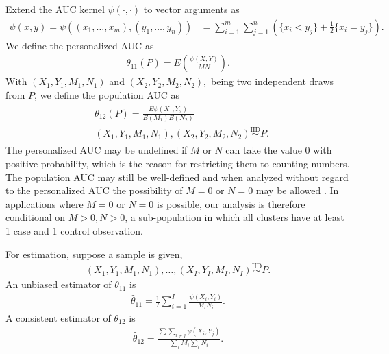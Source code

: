 \documentclass[12pt]{article}
\DeclareMathOperator{\AUC}{AUC}
\newcommand{\I}{I}
\newcommand{\E}{E}
\renewcommand{\P}{P}
\newcommand{\cind}{\perp \!\!\! \perp}
\newcommand{\aucindiv}{\theta_{11}}%
\newcommand{\aucpop}{\theta_{12}}%
\newcommand{\aucindivhat}{\hat{\theta}_{11}}%
\newcommand{\aucpophat}{\hat{\theta}_{12}}%
\newcommand{\kernel}{\psi}
\begin{document}
Extend the AUC kernel $\kernel(\cdot, \cdot)$ to vector arguments as
\begin{align}
  \kernel(x,y)=\kernel((x_1,\ldots,x_m),(y_1,\ldots,y_n))&=\sum_{i=1}^m\sum_{j=1}^n\left(\{x_i<y_j\}+\frac{1}{2}\{x_i=y_j\}\right).\label{defn:auc kernel}
\end{align}
We define the personalized AUC as
\begin{align}
  \aucindiv(\P)=\E\left(\frac{\psi(X,Y)}{MN} \right).
  \label{defn:aucindiv}
\end{align}
With $(X_1,Y_1,M_1,N_1)$ and $(X_2,Y_2,M_2,N_2),$ being two independent draws from $P$, we define the population AUC as
\begin{gather}
  \begin{aligned}
  &\aucpop(\P)=\frac{\E\psi(X_1,Y_2)}{\E(M_1)\E(N_2)}\label{defn:aucpop}\\
  &(X_1,Y_1,M_1,N_1),(X_2,Y_2,M_2,N_2) \overset{\text{IID}}{\sim} \P.
\end{aligned}
\end{gather}
The personalized AUC may be undefined if $M$ or $N$ can take the value
$0$ with positive probability, which is the reason for restricting
them to counting numbers. The population AUC may still be well-defined
and when analyzed without regard to the personalized AUC the possibility
of $M=0$ or $N=0$ may be allowed \citep{obuchowski1997}. In
applications where $M=0$ or $N=0$ is possible, our analysis is
therefore conditional on $M>0,N>0$, a sub-population in which all
clusters have at least 1 case and 1 control observation.

For estimation, suppose a sample is given,
\begin{align}
  (X_1,Y_1,M_1,N_1),\ldots,(X_\I,Y_\I,M_\I,N_\I) \overset{\text{IID}}{\sim} \P.
\end{align}
An unbiased estimator of $\aucindiv$ is
\begin{align}
  \aucindivhat = \frac{1}{I}\sum_{i=1}^\I \frac{\psi(X_i,Y_i)}{M_iN_i}. \label{defn:aucindivhat}
\end{align}
A consistent estimator of $\aucpop$ is
\begin{align}
  \aucpophat = \frac{\sum\sum_{i\neq j}\psi(X_i,Y_j)}{\sum_iM_i\sum_iN_i}. \label{defn:aucpophat}
\end{align}
\end{document}
